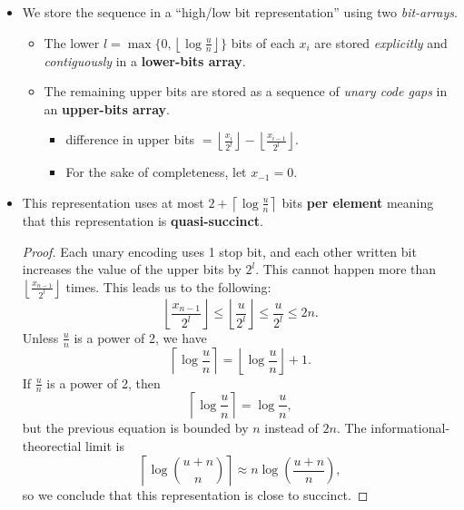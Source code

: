 \documentclass[10pt]{article}
\begin{document}
\begin{itemize}
\item
    We store the sequence in a ``high/low bit representation'' using two \textit{bit-arrays}.
    \begin{itemize}
    \item
        The lower \(l = \max{\lbrace 0, \left \lfloor\log{\frac{u}{n}} \right \rfloor \rbrace }\) 
        bits of each \(x_i\) are stored \textit{explicitly} and \textit{contiguously} in a 
        \textbf{lower-bits array}.
    \item
        The remaining upper bits are stored as a sequence of \textit{unary code gaps} in an
        \textbf{upper-bits array}.
        \begin{itemize}
        \item
            difference in upper bits 
            \(= \left \lfloor \frac{x_i}{2^l} \right \rfloor 
              - \left \lfloor \frac{x_{i-1}}{2^l} \right \rfloor\).
        \item
            For the sake of completeness, let \(x_{-1} = 0\).
        \end{itemize}
    \end{itemize}
\item
    This representation uses at most \(2 + \left \lceil \log{\frac{u}{n}} \right \rceil\) bits
    \textbf{per element} meaning that this representation is \textbf{quasi-succinct}.
    \begin{proof}
    Each unary encoding uses 1 stop bit, and each other written bit increases the value 
    of the upper bits by \(2^l\). 
    This cannot happen more than
    \( \left \lfloor \frac{x_{n-1}}{2^l} \right \rfloor \) times.
    This leads us to the following:
    \[ \left \lfloor \frac{x_{n-1}}{2^l} \right \rfloor 
       \leq \left \lfloor \frac{u}{2^l} \right \rfloor
       \leq \frac{u}{2^l} \leq 2n. \]
    Unless \(\frac{u}{n}\) is a power of 2, we have 
    \[ \left \lceil \log{\frac{u}{n}} \right \rceil 
       = \left \lfloor \log{\frac{u}{n}} \right \rfloor + 1. \]
    If \(\frac{u}{n}\) is a power of 2, then 
    \[ \left \lceil \log{\frac{u}{n}} \right \rceil = \log{\frac{u}{n}}, \]
    but the previous equation is bounded by \(n\) instead of \(2n\).
    The informational-theorectial limit is
    \[ \left \lceil \log{\binom{u + n}{n}} \right \rceil 
       \approx n \log{\left( \frac{u + n}{n} \right) }, \]
    so we conclude that this representation is close to succinct.
    \end{proof}
\end{itemize}
\end{document}
